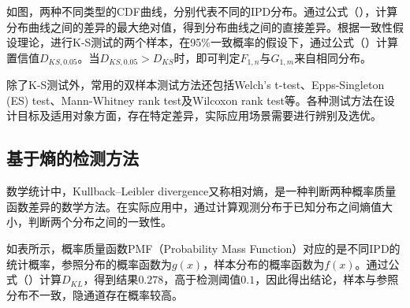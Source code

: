 如图，两种不同类型的CDF曲线，分别代表不同的IPD分布。通过公式（），计算分布曲线之间的差异的最大绝对值，得到分布曲线之间的直接差异。根据一致性假设理论，进行K-S测试的两个样本，在95\%一致概率的假设下，通过公式（）计算置信值$D_{KS,0.05}$。当$D_{KS,0.05}>D_{KS}$时，即可判定$F_{1,n}$与$G_{1,m}$来自相同分布。

除了K-S测试外，常用的双样本测试方法还包括Welch’s t-test、Epps-Singleton (ES) test、Mann-Whitney rank test及Wilcoxon rank test等。各种测试方法在设计目标及适用对象方面，存在特定差异，实际应用场景需要进行辨别及选优。

\subsection{基于熵的检测方法}
\label{chap:backinfo:detect:entropy}

数学统计中，Kullback–Leibler divergence又称相对熵，是一种判断两种概率质量函数差异的数学方法。在实际应用中，通过计算观测分布于已知分布之间熵值大小，判断两个分布之间的一致性。



如表所示，概率质量函数PMF（Probability Mass Function）对应的是不同IPD的统计概率，参照分布的概率函数为$g(x)$，样本分布的概率函数为$f(x)$。通过公式（）计算$D_{KL}$，得到结果$0.278$，高于检测阈值$0.1$，因此得出结论，样本与参照分布不一致，隐通道存在概率较高。

